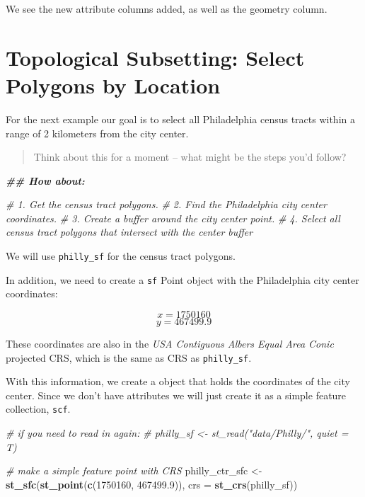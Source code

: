 \documentclass[
]{book}
\newenvironment{Shaded}{\begin{snugshade}}{\end{snugshade}}
\newcommand{\AttributeTok}[1]{\textcolor[rgb]{0.13,0.29,0.53}{#1}}
\newcommand{\CommentTok}[1]{\textcolor[rgb]{0.56,0.35,0.01}{\textit{#1}}}
\newcommand{\DecValTok}[1]{\textcolor[rgb]{0.00,0.00,0.81}{#1}}
\newcommand{\DocumentationTok}[1]{\textcolor[rgb]{0.56,0.35,0.01}{\textbf{\textit{#1}}}}
\newcommand{\FloatTok}[1]{\textcolor[rgb]{0.00,0.00,0.81}{#1}}
\newcommand{\FunctionTok}[1]{\textcolor[rgb]{0.13,0.29,0.53}{\textbf{#1}}}
\newcommand{\NormalTok}[1]{#1}
\newcommand{\OtherTok}[1]{\textcolor[rgb]{0.56,0.35,0.01}{#1}}
\begin{document}
We see the new attribute columns added, as well as the geometry column.

\hypertarget{topological-subsetting-select-polygons-by-location}{%
\section{Topological Subsetting: Select Polygons by Location}\label{topological-subsetting-select-polygons-by-location}}

For the next example our goal is to select all Philadelphia census tracts within a range of 2 kilometers from the city center.

\begin{quote}
Think about this for a moment -- what might be the steps you'd follow?
\end{quote}

\begin{Shaded}
\begin{Highlighting}[]
\DocumentationTok{\#\# How about:}

\CommentTok{\# 1. Get the census tract polygons.}
\CommentTok{\# 2. Find the Philadelphia city center coordinates.}
\CommentTok{\# 3. Create a buffer around the city center point.}
\CommentTok{\# 4. Select all census tract polygons that intersect with the center buffer}
\end{Highlighting}
\end{Shaded}

We will use \texttt{philly\_sf} for the census tract polygons.

In addition, we need to create a \texttt{sf} Point object with the Philadelphia city center coordinates:

\[x = 1750160\]
\[y = 467499.9\]

These coordinates are also in the \emph{USA Contiguous Albers Equal Area Conic} projected CRS, which is the same as CRS as \texttt{philly\_sf}.

With this information, we create a object that holds the coordinates of the city center. Since we don't have attributes we will just create it as a simple feature collection, \texttt{scf}.

\begin{Shaded}
\begin{Highlighting}[]
\CommentTok{\# if you need to read in again:}
\CommentTok{\# philly\_sf \textless{}{-} st\_read("data/Philly/", quiet = T)}

\CommentTok{\# make a simple feature point with CRS}
\NormalTok{philly\_ctr\_sfc }\OtherTok{\textless{}{-}} \FunctionTok{st\_sfc}\NormalTok{(}\FunctionTok{st\_point}\NormalTok{(}\FunctionTok{c}\NormalTok{(}\DecValTok{1750160}\NormalTok{, }\FloatTok{467499.9}\NormalTok{)), }\AttributeTok{crs =} \FunctionTok{st\_crs}\NormalTok{(philly\_sf))}
\end{Highlighting}
\end{Shaded}
\end{document}
